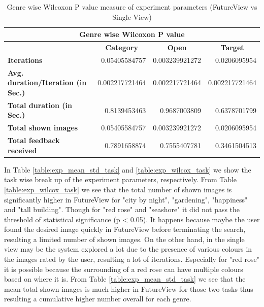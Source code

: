 \documentclass[english]{tktltiki}
\begin{document}
\begin{table}
	\small
	\begin{center}
    \begin{tabular}{|l|r|r|r|}
        \hline
        \multicolumn{4}{|c|}{\textbf{Genre wise Wilcoxon P value}} \\
        \hline
        
        \multicolumn{1}{|c|}{} & \multicolumn{1}{|c|}{\textbf{Category}} & \multicolumn{1}{|c|}{\textbf{Open}} & \multicolumn{1}{|c|}{\textbf{Target}} \\
        \hline
        
        
        
        \multicolumn{1}{|l|}{\textbf{Iterations}} & 0.05405584757 & 0.003239921272 & 0.0206095954 \\
        \hline
        
        \multicolumn{1}{|l|}{\textbf{Avg. duration/Iteration (in Sec.)}} & 0.002217721464 & 0.002217721464 & 0.002217721464 \\
        \hline
        
        \multicolumn{1}{|l|}{\textbf{Total duration (in Sec.)}} & 0.8139453463 & 0.9687003809 & 0.6378701799 \\
        \hline
        
        \multicolumn{1}{|l|}{\textbf{Total shown images}} & 0.05405584757 & 0.003239921272 & 0.0206095954 \\
        \hline
        
        \multicolumn{1}{|l|}{\textbf{Total feedback received}} & 0.7891658874 & 0.7555407781 & 0.3461504513 \\
        \hline
        
    \end{tabular}
	\end{center}
	\caption{Genre wise Wilcoxon P value measure of experiment parameters (FutureView vs Single View)}
    \label{table:exp_wilcoxon_genre}
\end{table}

 In Table \ref{table:exp_mean_std_task} and \ref{table:exp_wilcox_task} we show the task wise break up of the experiment parameters, respectively. From Table \ref{table:exp_wilcox_task} we see that the total number of shown images is significantly higher in FutureView for "city by night", "gardening", "happiness" and "tall building". Though for "red rose" and "seashore" it did not pass the threshold of statistical significance (p < 0.05). It happens because maybe the user found the desired image quickly in FutureView before terminating the search, resulting a limited number of shown images. On the other hand, in the single view may be the system explored a lot due to the presence of various colours in the images rated by the user, resulting a lot of iterations. Especially for "red rose" it is possible because the surrounding of a red rose can have multiple colours based on where it is. From Table \ref{table:exp_mean_std_task} we see that the mean total shown images is much higher in FutureView for those two tasks thus resulting a cumulative higher number overall for each genre.
\end{document}
